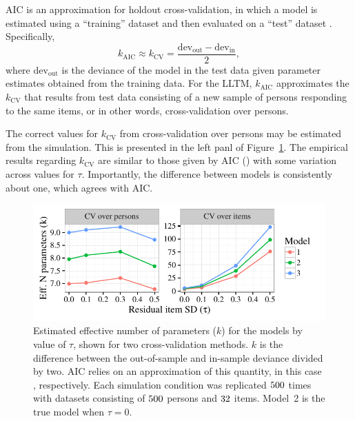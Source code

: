 \documentclass[12pt, letterpaper]{article}
\begin{document}
AIC is an approximation for holdout cross-validation, in which a model is estimated using a ``training'' dataset and then evaluated on a ``test'' dataset . Specifically,
\begin{equation}
	k_\mathrm{AIC} \approx k_\mathrm{CV} = \frac{\mathrm{dev_{out}} - \mathrm{dev_{in}}}{2}
,\end{equation}
where $\mathrm{dev_{out}}$ is the deviance of the model in the test data given parameter estimates obtained from the training data. 
For the LLTM, $k_\mathrm{AIC}$ approximates the $k_\mathrm{CV}$ that results from test data consisting of a new sample of persons responding to the same items, or in other words, cross-validation over persons.  

The correct values for $k_\mathrm{CV}$ from cross-validation over persons may be estimated from the simulation.
This is presented in the left panl of Figure~\ref{fig:k-overtau}. The empirical results regarding $k_\mathrm{CV}$ are similar to those given by AIC (\aic[and]) with some variation across values for $\tau$. Importantly, the difference between models is consistently about one, which agrees with AIC.

\begin{figure}[tbp]
	\centering
	\includegraphics{chapter_2/figs/k_overtau.pdf}
	\caption{Estimated effective number of parameters ($k$) for the models by value of $\tau$, shown for two cross-validation methods. $k$ is the difference between the out-of-sample and in-sample deviance divided by two. AIC relies on an approximation of this quantity, in this case \aic[and], respectively. Each simulation condition was replicated $500$ times with datasets consisting of $500$ persons and $32$ items. Model~2 is the true model when $\tau = 0$.}
	\label{fig:k-overtau}
\end{figure}
\end{document}
